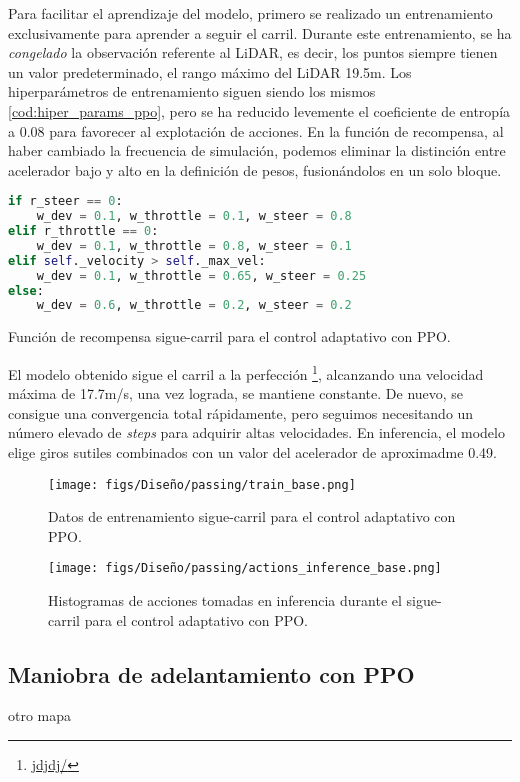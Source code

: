 Para facilitar el aprendizaje del modelo, primero se realizado un entrenamiento exclusivamente para aprender a seguir el carril. Durante este entrenamiento, se ha \textit{congelado} la observación referente al \ac{LiDAR}, es decir, los puntos siempre tienen un valor predeterminado, el rango máximo del \ac{LiDAR} 19.5m. Los hiperparámetros de entrenamiento siguen siendo los mismos \ref{cod:hiper_params_ppo}, pero se ha reducido levemente el coeficiente de entropía a 0.08 para favorecer al explotación de acciones. En la función de recompensa, al haber cambiado la frecuencia de simulación, podemos eliminar la distinción entre acelerador bajo y alto en la definición de pesos, fusionándolos en un solo bloque.

\begin{code}[h]
\begin{lstlisting}[language=Python]
if r_steer == 0:
	w_dev = 0.1, w_throttle = 0.1, w_steer = 0.8
elif r_throttle == 0:
	w_dev = 0.1, w_throttle = 0.8, w_steer = 0.1
elif self._velocity > self._max_vel:
	w_dev = 0.1, w_throttle = 0.65, w_steer = 0.25
else:
	w_dev = 0.6, w_throttle = 0.2, w_steer = 0.2
\end{lstlisting}
\caption[Función de recompensa sigue-carril para el control adaptativo con \ac{PPO}]{Función de recompensa sigue-carril para el control adaptativo con \ac{PPO}.}
\label{cod:rew_carril_ppo_passing}
\end{code}

El modelo obtenido sigue el carril a la perfección \footnote{\url{jdjdj/}}, alcanzando una velocidad máxima de 17.7m/s, una vez lograda, se mantiene constante. De nuevo, se consigue una convergencia total rápidamente, pero seguimos necesitando un número elevado de \textit{steps} para adquirir altas velocidades. En inferencia, el modelo elige giros sutiles combinados con un valor del acelerador de aproximadme 0.49.

\begin{figure}[ht]
  \centering
  \texttt{[image: figs/Diseño/passing/train\_base.png]}
  \caption{Datos de entrenamiento sigue-carril para el control adaptativo con \ac{PPO}.}
  \label{fig:passing_train_base}
\end{figure}

\begin{figure}[ht]
  \centering
  \texttt{[image: figs/Diseño/passing/actions\_inference\_base.png]}
  \caption{Histogramas de acciones tomadas en inferencia durante el sigue-carril para el control adaptativo con \ac{PPO}.}
  \label{fig:passing_actions_inf_base}
\end{figure}


\subsection{Maniobra de adelantamiento con PPO}

otro mapa